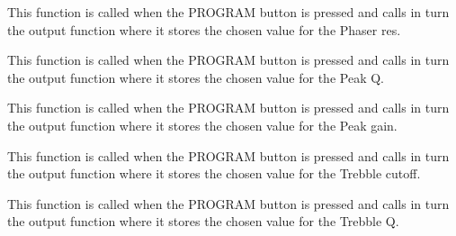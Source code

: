 \documentclass[letterpaper,10pt,english]{sphinxmanual}
\begin{document}

\begin{fulllineitems}
\label{Code:GUI.set_phaserRes}
This function is called when the PROGRAM button is pressed and calls in turn the output function where it stores the chosen 
value for the Phaser res.

\end{fulllineitems}


\begin{fulllineitems}
\label{Code:GUI.set_pq}
This function is called when the PROGRAM button is pressed and calls in turn the output function where it stores the chosen 
value for the Peak Q.

\end{fulllineitems}


\begin{fulllineitems}
\label{Code:GUI.set_pv}
This function is called when the PROGRAM button is pressed and calls in turn the output function where it stores the chosen 
value for the Peak gain.

\end{fulllineitems}


\begin{fulllineitems}
\label{Code:GUI.set_tc}
This function is called when the PROGRAM button is pressed and calls in turn the output function where it stores the chosen 
value for the Trebble cutoff.

\end{fulllineitems}


\begin{fulllineitems}
\label{Code:GUI.set_tq}
This function is called when the PROGRAM button is pressed and calls in turn the output function where it stores the chosen 
value for the Trebble Q.

\end{fulllineitems}
\end{document}
